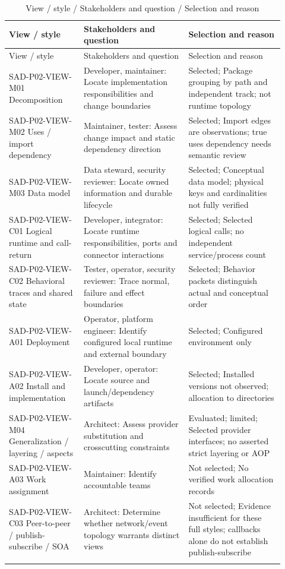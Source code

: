 \documentclass[10pt,letterpaper]{article}
\begin{document}
\begin{longtable}{@{}>{\raggedright\arraybackslash}p{0.25\linewidth}>{\raggedright\arraybackslash}p{0.35\linewidth}>{\raggedright\arraybackslash}p{0.32\linewidth}@{}}
\caption{View / style / Stakeholders and question / Selection and reason}\\
\toprule View / style & Stakeholders and question & Selection and reason\\\midrule\endfirsthead
\toprule View / style & Stakeholders and question & Selection and reason\\\midrule\endhead
SAD-P02-VIEW-M01 Decomposition & Developer, maintainer: Locate implementation responsibilities and change boundaries & Selected; Package grouping by path and independent track; not runtime topology\\\addlinespace
SAD-P02-VIEW-M02 Uses / import dependency & Maintainer, tester: Assess change impact and static dependency direction & Selected; Import edges are observations; true uses dependency needs semantic review\\\addlinespace
SAD-P02-VIEW-M03 Data model & Data steward, security reviewer: Locate owned information and durable lifecycle & Selected; Conceptual data model; physical keys and cardinalities not fully verified\\\addlinespace
SAD-P02-VIEW-C01 Logical runtime and call-return & Developer, integrator: Locate runtime responsibilities, ports and connector interactions & Selected; Selected logical calls; no independent service/process count\\\addlinespace
SAD-P02-VIEW-C02 Behavioral traces and shared state & Tester, operator, security reviewer: Trace normal, failure and effect boundaries & Selected; Behavior packets distinguish actual and conceptual order\\\addlinespace
SAD-P02-VIEW-A01 Deployment & Operator, platform engineer: Identify configured local runtime and external boundary & Selected; Configured environment only\\\addlinespace
SAD-P02-VIEW-A02 Install and implementation & Developer, operator: Locate source and launch/dependency artifacts & Selected; Installed versions not observed; allocation to directories\\\addlinespace
SAD-P02-VIEW-M04 Generalization / layering / aspects & Architect: Assess provider substitution and crosscutting constraints & Evaluated; limited; Selected provider interfaces; no asserted strict layering or AOP\\\addlinespace
SAD-P02-VIEW-A03 Work assignment & Maintainer: Identify accountable teams & Not selected; No verified work allocation records\\\addlinespace
SAD-P02-VIEW-C03 Peer-to-peer / publish-subscribe / SOA & Architect: Determine whether network/event topology warrants distinct views & Not selected; Evidence insufficient for these full styles; callbacks alone do not establish publish-subscribe\\\addlinespace
\bottomrule\end{longtable}
\end{document}
